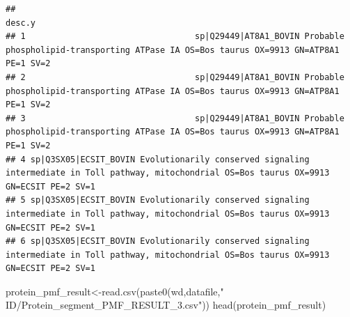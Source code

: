 \documentclass[
]{article}
\newenvironment{Shaded}{\begin{snugshade}}{\end{snugshade}}
\newcommand{\FunctionTok}[1]{\textcolor[rgb]{0.00,0.00,0.00}{#1}}
\newcommand{\NormalTok}[1]{#1}
\newcommand{\OtherTok}[1]{\textcolor[rgb]{0.56,0.35,0.01}{#1}}
\newcommand{\StringTok}[1]{\textcolor[rgb]{0.31,0.60,0.02}{#1}}
\begin{document}
\begin{verbatim}
##                                                                                                                                          desc.y
## 1                                  sp|Q29449|AT8A1_BOVIN Probable phospholipid-transporting ATPase IA OS=Bos taurus OX=9913 GN=ATP8A1 PE=1 SV=2
## 2                                  sp|Q29449|AT8A1_BOVIN Probable phospholipid-transporting ATPase IA OS=Bos taurus OX=9913 GN=ATP8A1 PE=1 SV=2
## 3                                  sp|Q29449|AT8A1_BOVIN Probable phospholipid-transporting ATPase IA OS=Bos taurus OX=9913 GN=ATP8A1 PE=1 SV=2
## 4 sp|Q3SX05|ECSIT_BOVIN Evolutionarily conserved signaling intermediate in Toll pathway, mitochondrial OS=Bos taurus OX=9913 GN=ECSIT PE=2 SV=1
## 5 sp|Q3SX05|ECSIT_BOVIN Evolutionarily conserved signaling intermediate in Toll pathway, mitochondrial OS=Bos taurus OX=9913 GN=ECSIT PE=2 SV=1
## 6 sp|Q3SX05|ECSIT_BOVIN Evolutionarily conserved signaling intermediate in Toll pathway, mitochondrial OS=Bos taurus OX=9913 GN=ECSIT PE=2 SV=1
\end{verbatim}

\begin{Shaded}
\begin{Highlighting}[]
\NormalTok{protein\_pmf\_result}\OtherTok{\textless{}{-}}\FunctionTok{read.csv}\NormalTok{(}\FunctionTok{paste0}\NormalTok{(wd,datafile,}\StringTok{" ID/Protein\_segment\_PMF\_RESULT\_3.csv"}\NormalTok{))}
\FunctionTok{head}\NormalTok{(protein\_pmf\_result)}
\end{Highlighting}
\end{Shaded}
\end{document}

